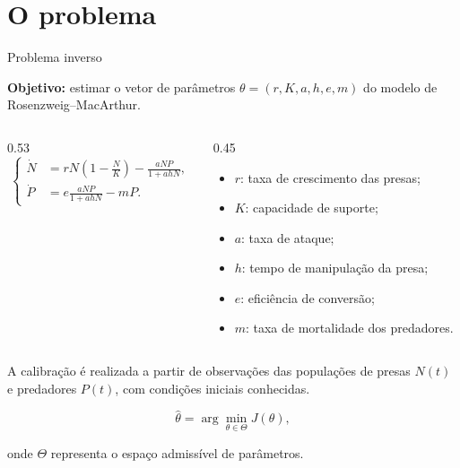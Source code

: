 \section{O problema}

\begin{frame}{Problema inverso}

  \textbf{Objetivo:} estimar o vetor de parâmetros
  $\theta=(r,K,a,h,e,m)$ do modelo de Rosenzweig--MacArthur.

  \vspace{0.3cm}

  \begin{columns}[c,onlytextwidth]
    \begin{column}{0.53\textwidth}
      \[
        \left\{
        \begin{aligned}
          \dot N &= rN\left(1-\frac{N}{K}\right)
                    -\frac{aNP}{1+ahN}, \\[0.3cm]
          \dot P &= e\frac{aNP}{1+ahN}-mP.
        \end{aligned}
        \right.
      \]
    \end{column}
    \begin{column}{0.45\textwidth}
      \small
      \begin{itemize}
        \item $r$: taxa de crescimento das presas;
        \item $K$: capacidade de suporte;
        \item $a$: taxa de ataque;
        \item $h$: tempo de manipulação da presa;
        \item $e$: eficiência de conversão;
        \item $m$: taxa de mortalidade dos predadores.
      \end{itemize}
    \end{column}
  \end{columns}

  \vspace{0.3cm}

  A calibração é realizada a partir de observações das populações
  de presas $N(t)$ e predadores $P(t)$, com condições iniciais
  conhecidas.

  \[
    \hat{\theta}=\arg\min_{\theta\in\Theta} J(\theta),
  \]

  onde $\Theta$ representa o espaço admissível de parâmetros.

\end{frame}


